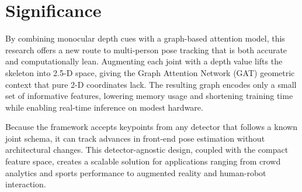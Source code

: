 \section{Significance}

By combining monocular depth cues with a graph-based attention model, this
research offers a new route to multi-person pose tracking that is both accurate
and computationally lean.  Augmenting each joint with a depth value lifts the
skeleton into 2.5-D space, giving the Graph Attention Network (GAT) geometric
context that pure 2-D coordinates lack.  The resulting graph encodes only a
small set of informative features, lowering memory usage and shortening
training time while enabling real-time inference on modest hardware.  

Because the framework accepts keypoints from any detector that follows a known
joint schema, it can track advances in front-end pose estimation without
architectural changes. This detector-agnostic design, coupled with the compact
feature space, creates a scalable solution for applications ranging from crowd
analytics and sports performance to augmented reality and human-robot
interaction.